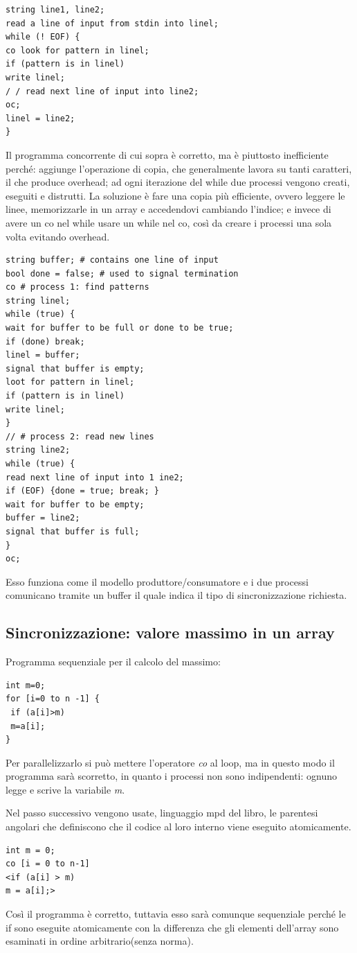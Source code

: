 \documentclass[10pt,a4paper]{article}
\begin{document}
\begin{verbatim}
string line1, line2;
read a line of input from stdin into linel;
while (! EOF) {
co look for pattern in linel;
if (pattern is in linel)
write linel;
/ / read next line of input into line2;
oc;
linel = line2;
}
\end{verbatim}


Il programma concorrente di cui sopra è corretto, ma è piuttosto inefficiente perché: aggiunge l'operazione di copia, che generalmente lavora su tanti caratteri, il che produce overhead; ad ogni iterazione del while  due processi vengono creati, eseguiti e distrutti.
La soluzione è fare una copia più efficiente, ovvero leggere le linee, memorizzarle in un array e accedendovi cambiando l'indice; e invece di avere un co nel while usare un while nel co, così da creare i processi una sola volta evitando overhead.

\begin{verbatim}
string buffer; # contains one line of input
bool done = false; # used to signal termination
co # process 1: find patterns
string linel;
while (true) {
wait for buffer to be full or done to be true;
if (done) break;
linel = buffer;
signal that buffer is empty;
loot for pattern in linel;
if (pattern is in linel)
write linel;
}
// # process 2: read new lines
string line2;
while (true) {
read next line of input into 1 ine2;
if (EOF) {done = true; break; }
wait for buffer to be empty;
buffer = line2;
signal that buffer is full;
}
oc;
\end{verbatim}


Esso funziona come il modello produttore/consumatore e i due processi comunicano tramite un buffer il quale indica il tipo di sincronizzazione richiesta.

\subsection{Sincronizzazione: valore massimo in un array}
Programma sequenziale per il calcolo del massimo:
\begin{verbatim}
int m=0;
for [i=0 to n -1] {
 if (a[i]>m)
 m=a[i];
} 
\end{verbatim}

Per parallelizzarlo si può mettere l'operatore \textit{co} al loop, ma in questo modo il programma sarà scorretto, in quanto i processi non sono indipendenti: ognuno legge e scrive la variabile \textit{m}.

Nel passo successivo vengono usate, linguaggio mpd del libro, le parentesi angolari che definiscono che il codice al loro interno viene eseguito atomicamente.
\begin{verbatim}
int m = 0;
co [i = 0 to n-1]
<if (a[i] > m)
m = a[i];>
\end{verbatim} 
Così il programma è corretto, tuttavia esso sarà comunque sequenziale perché le if sono eseguite atomicamente con la differenza che gli elementi dell'array sono esaminati in ordine arbitrario(senza norma).
\end{document}
